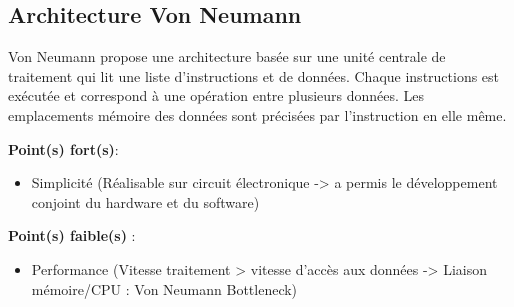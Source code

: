 \documentclass[12pt,a4paper,oneside, titlepage]{article}
\begin{document}
\subsection*{Architecture Von Neumann}
Von Neumann propose une architecture basée sur une unité centrale de traitement qui lit une liste d'instructions et de données. Chaque instructions est exécutée et correspond à une opération entre plusieurs données. Les emplacements mémoire des données sont précisées par l'instruction en elle même.\newline

\textbf{Point(s) fort(s)}:

\begin{itemize}
\item Simplicité (Réalisable sur circuit électronique -> a permis le développement conjoint du hardware et du software)
\end{itemize}

\textbf{Point(s) faible(s)} :

\begin{itemize}
\item Performance (Vitesse traitement > vitesse d'accès aux données -> Liaison mémoire/CPU : Von Neumann Bottleneck)
\end{itemize}
\end{document}
